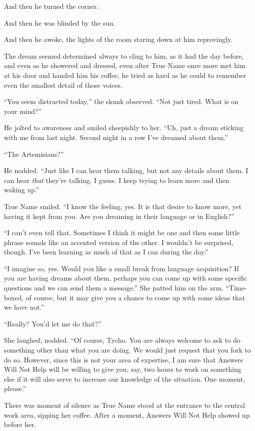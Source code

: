 And then he turned the corner.

And then he was blinded by the sun.

And then he awoke, the lights of the room staring down at him reprovingly.

The dream seemed determined always to cling to him, as it had the day before, and even as he showered and dressed, even after True Name once more met him at his door and handed him his coffee, he tried as hard as he could to remember even the smallest detail of those voices.

``You seem distracted today,'' the skunk observed. ``Not just tired. What is on your mind?''

He jolted to awareness and smiled sheepishly to her. ``Uh, just a dream sticking with me from last night. Second night in a row I've dreamed about them.''

``The Artemisians?''

He nodded. ``Just like I can hear them talking, but not any details about them. I can hear \emph{that} they're talking, I guess. I keep trying to learn more and then waking up.''

True Name smiled. ``I know the feeling, yes. It is that desire to know more, yet having it kept from you. Are you dreaming in their language or in English?''

``I can't even tell that. Sometimes I think it might be one and then some little phrase sounds like an accented version of the other. I wouldn't be surprised, though. I've been learning as much of that as I can during the day.''

``I imagine so, yes. Would you like a small break from language acquisition? If you are having dreams about them, perhaps you can come up with some specific questions and we can send them a message.'' She patted him on the arm. ``Time-boxed, of course, but it may give you a chance to come up with some ideas that we have not.''

``Really? You'd let me do that?''

She laughed, nodded. ``Of course, Tycho. You are always welcome to ask to do something other than what you are doing. We would just request that you fork to do so. However, since this is not your area of expertise, I am sure that Answers Will Not Help will be willing to give you, say, two hours to work on something else if it will also serve to increase our knowledge of the situation. One moment, please.''

There was moment of silence as True Name stood at the entrance to the central work area, sipping her coffee. After a moment, Answers Will Not Help showed up before her.

